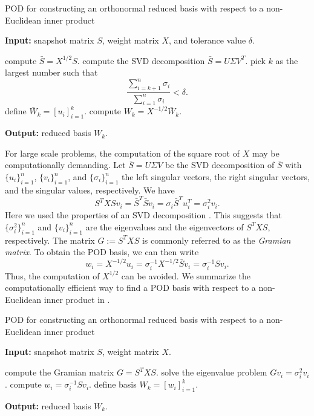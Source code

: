 \begin{algorithm} 
	\caption{POD for constructing an orthonormal reduced basis with respect to a non-Euclidean inner product} \label{alg:3.2}
	\textbf{Input:} snapshot matrix $S$, weight matrix $X$, and tolerance value $\delta$.
	\begin{algorithmic} [1]
		\State compute $\bar S = X^{1/2} S$.
		\State compute the SVD decomposition $\bar S = U \Sigma V^T$.
		\State pick $k$ as the largest number such that
		\[
			\frac{\sum_{i=k+1}^n \sigma_i}{\sum_{i=1}^n \sigma_i} < \delta.
		\]
		\State define $\bar W_k = [u_i]_{i=1}^k$.
		\State compute $W_k = X^{-1/2} \bar W_k$.
	\end{algorithmic}
	\vspace{0.5cm}
	\textbf{Output:} reduced basis $W_k$.
\end{algorithm}
For large scale problems, the computation of the square root of $X$ may be computationally demanding. Let $\bar S = U\Sigma V$ be the SVD decomposition of $\bar S$ with $\{u_i\}_{i=1}^{n}$, $\{v_i\}_{i=1}^{n}$, and $\{ \sigma_i \}_{i=1}^n$ the left singular vectors, the right singular vectors, and the singular values, respectively. We have
\begin{equation} \label{eq:3.23}
	S^TXS v_i = \bar S^T \bar S v_i = \sigma_i \bar S^T u_i^T = \sigma_i^2 v_i. 
\end{equation}
Here we used the properties of an SVD decomposition \cite{trefethen97}. This suggests that $\{\sigma_i^2\}_{i=1}^{n}$ and $\{v_i\}_{i=1}^n$ are the eigenvalues and the eigenvectors of $S^TXS$, respectively. The matrix $G:=S^TXS$ is commonly referred to as the \emph{Gramian matrix}. To obtain the POD basis, we can then write
\begin{equation} \label{eq:3.24}
	w_i = X^{-1/2} u_i = \sigma_i^{-1} X^{-1/2} \bar S v_i = \sigma_i^{-1} S v_i.
\end{equation}
Thus, the computation of $X^{1/2}$ can be avoided. We summarize the computationally efficient way to find a POD basis with respect to a non-Euclidean inner product in .

\begin{algorithm} 
	\caption{POD for constructing an orthonormal reduced basis with respect to a non-Euclidean inner product} \label{alg:3.3}
	\textbf{Input:} snapshot matrix $S$, weight matrix $X$.
	\begin{algorithmic} [1]
		\State compute the Gramian matrix $ G = S^TXS$.
		\State solve the eigenvalue problem $Gv_i = \sigma_i^2 v_i$. 
		\State compute $w_i = \sigma_i^{-1} S v_i$.
		\State define basis $W_k = [w_i]_{i=1}^k$.
	\end{algorithmic}
	\vspace{0.5cm}
	\textbf{Output:} reduced basis $W_k$.
\end{algorithm}

